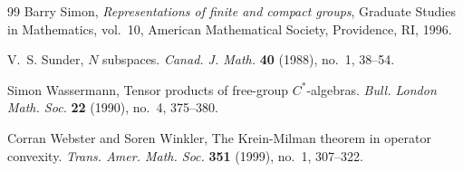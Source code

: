 \documentclass{amsart}
\theoremstyle{definition}
\theoremstyle{remark}
\numberwithin{equation}{section}
\begin{document}
\begin{thebibliography}{99}
Barry Simon, \emph{Representations of finite and compact groups}, Graduate
  Studies in Mathematics, vol.~10, American Mathematical Society, Providence,
  RI, 1996. %

V.~S. Sunder,  {$N$} subspaces. \emph{Canad. J. Math.} \textbf{40} (1988),
  no.~1, 38--54. %

Simon Wassermann, Tensor products of free-group {$C^*$}-algebras. \emph{Bull.
  London Math. Soc.} \textbf{22} (1990), no.~4, 375--380. %

Corran Webster and Soren Winkler, The {K}rein-{M}ilman theorem in
  operator convexity. \emph{Trans. Amer. Math. Soc.} \textbf{351} (1999), no.~1,
  307--322. %



\end{thebibliography}
\end{document}

